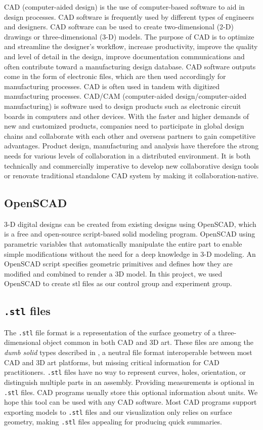 \documentclass[sigconf,authorversion,nonacm]{acmart}
\begin{document}
CAD (computer-aided design) is the use of computer-based software to aid in design processes. CAD software is frequently used by different types of engineers and designers. CAD software can be used to create two-dimensional (2-D) drawings or three-dimensional (3-D) models.
The purpose of CAD is to optimize and streamline the designer's workflow, increase productivity, improve the quality and level of detail in the design, improve documentation communications and often contribute toward a manufacturing design database.
CAD software outputs come in the form of electronic files, which are then used accordingly for manufacturing processes. CAD is often used in tandem with digitized manufacturing processes. CAD/CAM (computer-aided design/computer-aided manufacturing) is software used to design products such as electronic circuit boards in computers and other devices.
With the faster and higher demands of new and customized products, companies need to participate in global design chains and collaborate with each other and overseas partners to gain competitive advantages. Product design, manufacturing and analysis have therefore the strong needs for various levels of collaboration in a distributed environment.
It is both technically and commercially imperative to develop new collaborative design tools or renovate traditional standalone CAD system by making it collaboration-native.

\subsection{OpenSCAD}
3-D digital designs can be created from existing designs using OpenSCAD, which is a free and open-source script-based solid modeling program. OpenSCAD using parametric variables that automatically manipulate the entire part to enable simple modifications without the need for a deep knowledge in 3-D modeling. An OpenSCAD script specifies geometric primitives and defines how they are modified and combined to render a 3D model.
In this project, we used OpenSCAD to create stl files as our control group and experiment group.
\subsection{\texttt{.stl} files}

The \texttt{.stl} file format is a representation of the surface geometry of a three-dimensional object common in both CAD and 3D art.
These files are among the \textit{dumb solid} types described in \citet{cheng2023age}, a neutral file format interoperable between most CAD and 3D art platforms, but missing critical information for CAD practitioners.
\texttt{.stl} files have no way to represent curves, holes, orientation, or distinguish multiple parts in an assembly.
Providing measurements is optional in \texttt{.stl} files. CAD programs usually store this optional information about units.
We hope this tool can be used with any CAD software.
Most CAD programs support exporting models to \texttt{.stl} files and our visualization only relies on surface geometry, making \texttt{.stl} files appealing for producing quick summaries.
\end{document}

